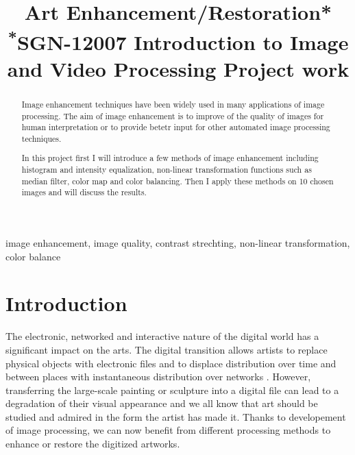 \documentclass[conference]{IEEEtran}
\begin{document}
\title{Art Enhancement/Restoration*\\
{\footnotesize \textsuperscript{*}SGN-12007 Introduction to Image and Video Processing
Project work}}


\author{
}

\maketitle

\begin{abstract}
Image enhancement techniques have been widely used in many applications of image processing. The aim of image enhancement is to improve of the quality of images for human interpretation or to provide betetr input for other automated image processing techniques. 

In this project first I will introduce a few methods of image enhancement including histogram and intensity equalization, non-linear transformation functions such as median filter, color map and color balancing. Then I apply these methods on 10 chosen images and will discuss the results. 

\end{abstract}

\begin{IEEEkeywords}
image enhancement, image quality, contrast strechting, non-linear transformation, color balance\end{IEEEkeywords}

\section{Introduction}

The electronic, networked and interactive nature of the digital world has a significant impact on the arts.  The digital transition allows artists to replace physical objects with electronic files and to displace distribution over time and between places with instantaneous distribution over networks \cite{poole}. However, transferring the large-scale painting or sculpture into a digital file can lead to a degradation of their visual appearance and we all know that art should be studied and admired in the form the artist has made it. Thanks to developement of image processing, we can now benefit from different processing methods to enhance or restore the digitized artworks.    
\end{document}
